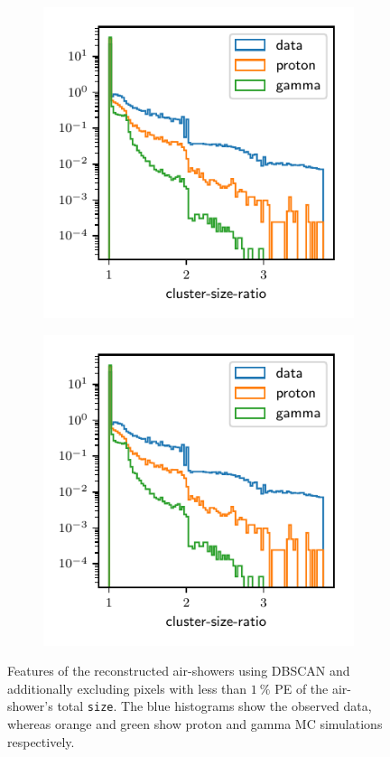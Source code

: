 %
%
\begin{figure}
  \begin{subfigure}{0.5\textwidth}
    \includegraphics[width=\textwidth, page=23]{Plots/data_mc/features_DBSCAN_perc.pdf}
  \end{subfigure}
  \begin{subfigure}{0.5\textwidth}
    \includegraphics[width=\textwidth, page=13]{Plots/data_mc/features_DBSCAN_perc.pdf}
  \end{subfigure}
  \caption{Features of the reconstructed air-showers using DBSCAN and additionally excluding pixels with less than $\SI{1}{\percent}$ PE of the air-shower's total \texttt{size}. The blue histograms show the observed data, whereas orange and green show proton and gamma MC simulations respectively.}
  \label{fig:feat_dbscan_perc}
\end{figure}
